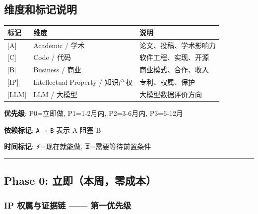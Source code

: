 \documentclass[
  12pt,
]{ctexart}
\begin{document}
\subsection{维度和标记说明}\label{ux7ef4ux5ea6ux548cux6807ux8bb0ux8bf4ux660e}

\begin{longtable}[]{@{}lll@{}}
\toprule\noalign{}
标记 & 维度 & 说明 \\
\midrule\noalign{}
\endhead
\bottomrule\noalign{}
\endlastfoot
{[}A{]} & Academic / 学术 & 论文、投稿、学术影响力 \\
{[}C{]} & Code / 代码 & 软件工程、实现、开源 \\
{[}B{]} & Business / 商业 & 商业模式、合作、收入 \\
{[}IP{]} & Intellectual Property / 知识产权 & 专利、权属、保护 \\
{[}LLM{]} & LLM / 大模型 & 大模型数据评价方向 \\
\end{longtable}

\textbf{优先级}: P0=立即做, P1=1-2月内, P2=3-6月内, P3=6-12月

\textbf{依赖标记}: \texttt{A\ →\ B} 表示 A 阻塞 B

\textbf{时间标记}: ⚡=现在就能做, ⏳=需要等待前置条件

\begin{center}\rule{0.5\linewidth}{0.5pt}\end{center}

\subsection{Phase 0:
立即（本周，零成本）}\label{phase-0-ux7acbux5373ux672cux5468ux96f6ux6210ux672c}

\subsubsection{IP 权属与证据链 ------
第一优先级}\label{ip-ux6743ux5c5eux4e0eux8bc1ux636eux94fe-ux7b2cux4e00ux4f18ux5148ux7ea7}
\end{document}
